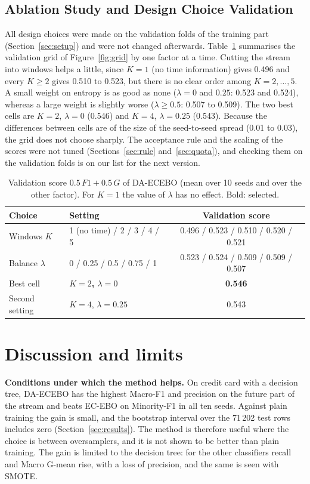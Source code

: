 \documentclass[preprint,10pt]{elsarticle}
\let\OldSubsection\subsection
\renewcommand{\subsection}{\OldSubsection}
\begin{document}
\subsection{Ablation Study and Design Choice Validation}\label{sec:ablation_eval}\label{sec:design}
All design choices were made on the validation folds of the training part (Section~\ref{sec:setup}) and were not changed afterwards. Table~\ref{tab:design} summarises the validation grid of Figure~\ref{fig:grid} by one factor at a time. Cutting the stream into windows helps a little, since $K=1$ (no time information) gives 0.496 and every $K\geq2$ gives 0.510 to 0.523, but there is no clear order among $K=2,\ldots,5$. A small weight on entropy is as good as none ($\lambda=0$ and $0.25$: 0.523 and 0.524), whereas a large weight is slightly worse ($\lambda\geq0.5$: 0.507 to 0.509). The two best cells are $K=2$, $\lambda=0$ (0.546) and $K=4$, $\lambda=0.25$ (0.543). Because the differences between cells are of the size of the seed-to-seed spread (0.01 to 0.03), the grid does not choose sharply. The acceptance rule and the scaling of the scores were not tuned (Sections~\ref{sec:rule} and~\ref{sec:quota}), and checking them on the validation folds is on our list for the next version.

\begin{table}[!htbp]
\centering\small
\caption{Validation score $0.5\,F1+0.5\,G$ of DA-ECEBO (mean over 10 seeds and over the other factor). For $K=1$ the value of $\lambda$ has no effect. Bold: selected.}\label{tab:design}
\begin{tabular}{llc}
\toprule
Choice & Setting & Validation score\\
\midrule
Windows $K$ & 1 (no time) / 2 / 3 / 4 / 5 & 0.496 / 0.523 / 0.510 / 0.520 / 0.521\\
Balance $\lambda$ & 0 / 0.25 / 0.5 / 0.75 / 1 & 0.523 / 0.524 / 0.509 / 0.509 / 0.507\\
Best cell & \textbf{$K=2$, $\lambda=0$} & \textbf{0.546}\\
Second setting & $K=4$, $\lambda=0.25$ & 0.543\\
\bottomrule
\end{tabular}
\end{table}


\section{Discussion and limits}\label{sec:discussion}
\textbf{Conditions under which the method helps.} \quad On credit card with a decision tree, DA-ECEBO has the highest Macro-F1 and precision on the future part of the stream and beats EC-EBO on Minority-F1 in all ten seeds. Against plain training the gain is small, and the bootstrap interval over the 71\,202 test rows includes zero (Section~\ref{sec:results}). The method is therefore useful where the choice is between oversamplers, and it is not shown to be better than plain training. The gain is limited to the decision tree: for the other classifiers recall and Macro G-mean rise, with a loss of precision, and the same is seen with SMOTE.
\end{document}

